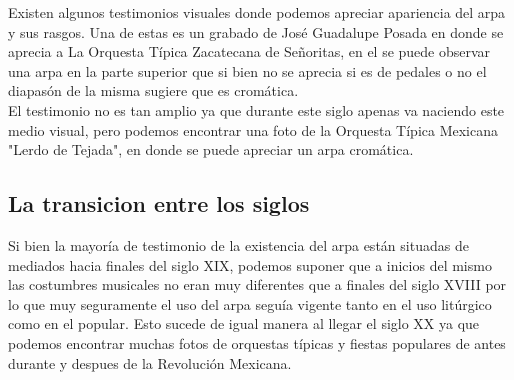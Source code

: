 Existen algunos testimonios visuales donde podemos apreciar apariencia del arpa y sus rasgos. Una de estas es un grabado de José Guadalupe Posada en donde se aprecia a La Orquesta Típica Zacatecana de Señoritas, en el se puede observar una arpa en la parte superior que si bien no se aprecia si es de pedales o no el diapasón de la misma sugiere que es cromática.\\
El testimonio no es tan amplio ya que durante este siglo apenas va naciendo este medio visual, pero podemos encontrar una foto de la Orquesta Típica Mexicana "Lerdo de Tejada", en donde se puede apreciar un arpa cromática.

\subsection{La transicion entre los siglos}
Si bien la mayoría de testimonio de la existencia del arpa están situadas de mediados hacia finales del siglo XIX, podemos suponer que a inicios del mismo las costumbres musicales no eran muy diferentes que a finales del siglo XVIII por lo que  muy seguramente el uso del arpa seguía vigente tanto en el uso litúrgico como en el popular. Esto sucede de igual manera al llegar el siglo XX ya que podemos encontrar muchas fotos de orquestas típicas y fiestas populares de antes durante y despues de la Revolución Mexicana.